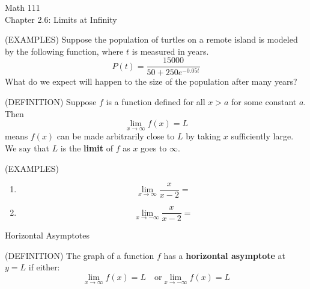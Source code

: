 \documentclass[11pt]{article}
\begin{document}
\begin{center}
\Large
\rm{Math 111}
\\
\rm{Chapter 2.6:  Limits at Infinity}
\\
\end{center}
\vspace{0.2in}

(EXAMPLES)  Suppose the population of turtles on a remote island is modeled by the following function, where $t$ is measured in years.
\begin{displaymath}
  P(t) = \frac{15000}{50 + 250e^{-0.05t}}
  \end{displaymath}
What do we expect will happen to the size of the population after many years?\\

\vspace{2in}

(DEFINITION)  Suppose $f$ is a function defined for all $x>a$ for some constant $a$.  Then 
\begin{displaymath}
  \lim_{x\to \infty}f(x) = L
  \end{displaymath}
means $f(x)$ can be made arbitrarily close to $L$ by taking $x$ sufficiently large.  We say that $L$ is the {\bf limit} of $f$ as $x$ goes to $\infty$.

\vspace{0.5in}

(EXAMPLES)
\begin{enumerate}
  \item{
\begin{displaymath}
  \lim_{x\to \infty} \frac{x}{x-2} = 
  \end{displaymath}
}
\vspace{1.5in}


  \item{
\begin{displaymath}
  \lim_{x\to -\infty} \frac{x}{x-2} = 
  \end{displaymath}
  }

      \end{enumerate}



\pagebreak

\begin{center}
\Large
\rm{Horizontal Asymptotes}
\end{center}


(DEFINITION) The graph of a function $f$ has a {\bf horizontal asymptote} at $y=L$ if either:
 \begin{displaymath}
  \lim_{x\to \infty} f(x) = L \quad \textrm{or} \lim_{x\to -\infty} f(x) = L
  \end{displaymath}
  
\end{document}
